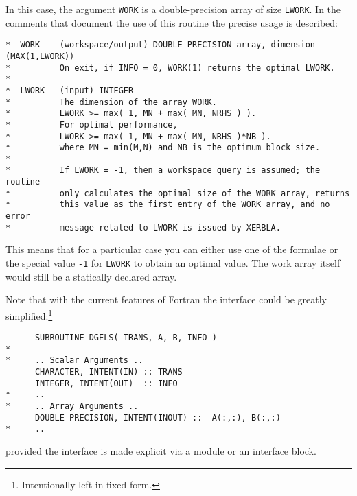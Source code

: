 In this case, the argument \verb+WORK+ is a double-precision array of
size \verb+LWORK+. In the comments that document the use of this routine
the precise usage is described:
%
\begin{verbatim}
*  WORK    (workspace/output) DOUBLE PRECISION array, dimension (MAX(1,LWORK))
*          On exit, if INFO = 0, WORK(1) returns the optimal LWORK.
*
*  LWORK   (input) INTEGER
*          The dimension of the array WORK.
*          LWORK >= max( 1, MN + max( MN, NRHS ) ).
*          For optimal performance,
*          LWORK >= max( 1, MN + max( MN, NRHS )*NB ).
*          where MN = min(M,N) and NB is the optimum block size.
*
*          If LWORK = -1, then a workspace query is assumed; the routine
*          only calculates the optimal size of the WORK array, returns
*          this value as the first entry of the WORK array, and no error
*          message related to LWORK is issued by XERBLA.
\end{verbatim}

This means that for a particular case you can either use one of the formulae
or the special value \verb+-1+ for \verb+LWORK+ to obtain an optimal value.
The work array itself would still be a statically declared array.

Note that with the current features of Fortran the interface could be greatly
simplified:\footnote{Intentionally left in fixed form.}
%
\begin{verbatim}
      SUBROUTINE DGELS( TRANS, A, B, INFO )
*
*     .. Scalar Arguments ..
      CHARACTER, INTENT(IN) :: TRANS
      INTEGER, INTENT(OUT)  :: INFO
*     ..
*     .. Array Arguments ..
      DOUBLE PRECISION, INTENT(INOUT) ::  A(:,:), B(:,:)
*     ..
\end{verbatim}
%
\noindent provided the interface is made explicit via a module or an interface block.
